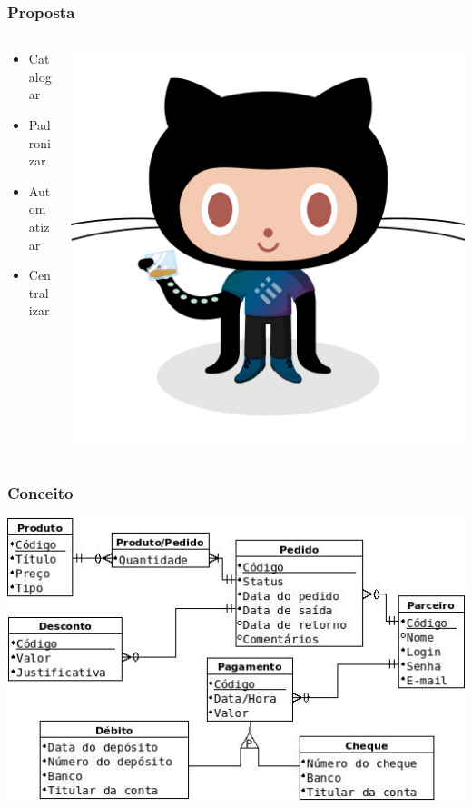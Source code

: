 \documentclass{beamer}
\begin{document}
\begin{frame}
  \frametitle{Proposta}
  \begin{columns}[T]
    \begin{column}{.5\textwidth}
      \begin{itemize}
        \itemsep 1em
        \item Catalogar
        \item Padronizar
        \item Automatizar
        \item Centralizar
      \end{itemize}
    \end{column}
    \begin{column}{.5\textwidth}
      \includegraphics[width=\textwidth]{proposta.jpg}
    \end{column}
  \end{columns}
\end{frame}

\begin{frame}
  \frametitle{Conceito}
  \includegraphics[width=\textwidth]{modelagem.jpg}
\end{frame}
\end{document}
